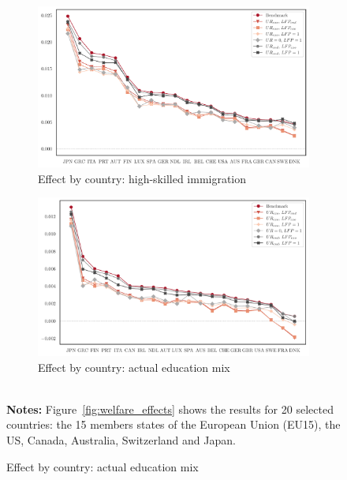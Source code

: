 \documentclass[a4paper,12pt]{article}
\begin{document}
{\begin{landscape}
\begin{center}
\begin{figure}[htb!]
\begin{subfigure}{.45\linewidth}
  \caption{Effect by country: high-skilled immigration} \label{fig:welfare_effects_c}
  \includegraphics[width=\linewidth]{graphs/Welf_HS.pdf}
\end{subfigure}%
\hfill
\begin{subfigure}{.45\linewidth}
  \centering
  \caption{Effect by country: actual education mix} \label{fig:welfare_effects_d}
  \includegraphics[width=\linewidth]{graphs/Welf_LS+HS.pdf}
\end{subfigure}
\\[0.5cm]
{\footnotesize \textbf{Notes:} Figure~\ref{fig:welfare_effects} shows the results for 20 selected countries:
the 15 members states of the European Union (EU15), the US, Canada,
Australia, Switzerland and Japan.}
\end{figure}
\end{center}
\end{landscape}
\restoregeometry } 
\end{document}
